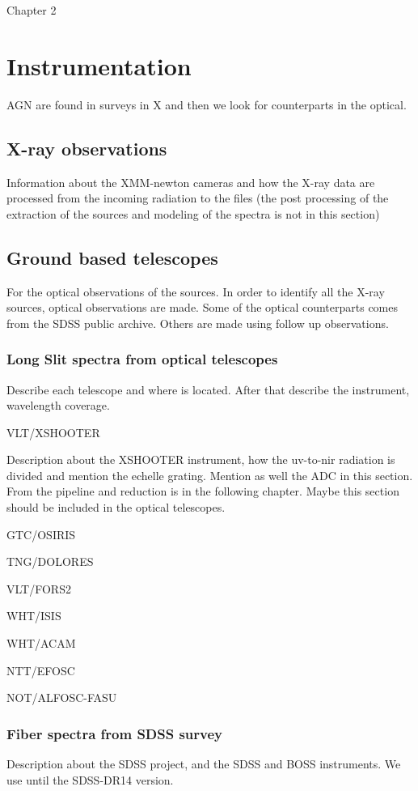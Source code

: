 Chapter 2

\chapter{Instrumentation} %
\label{chap:ins}

AGN are found in surveys in X and then we look for counterparts in the optical.

\section{X-ray observations}
\label{sec2:xr}


\label{sec2:xr}
Information about the XMM-newton cameras and how the X-ray data are processed from the incoming radiation to the files (the post processing of the extraction of the sources and modeling of the spectra is not in this section)



\section{Ground based telescopes}
\label{sec2:tel}

For the optical observations of the sources. In order to identify all the X-ray sources, optical observations are made. Some of the optical counterparts comes from the SDSS public archive. Others are made using follow up observations.



\subsection{Long Slit spectra from optical telescopes}
\label{sec2:otel}

Describe each telescope and where is located. After that describe the instrument, wavelength coverage.

VLT/XSHOOTER

Description about the XSHOOTER instrument, how the uv-to-nir radiation is divided and mention the echelle grating. Mention as well the ADC in this section. From the pipeline and reduction is in the following chapter. Maybe this section should be included in the optical telescopes.

GTC/OSIRIS

TNG/DOLORES

VLT/FORS2

WHT/ISIS

WHT/ACAM

NTT/EFOSC

NOT/ALFOSC-FASU

\subsection{Fiber spectra from SDSS survey}
\label{sec2:sdss}

Description about the SDSS project, and the SDSS and BOSS instruments. We use until the SDSS-DR14 version.
